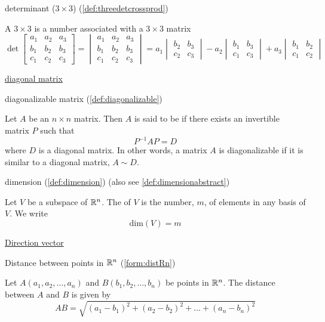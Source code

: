 \documentclass{ximera}
\begin{document}
determinant ($3\times 3$) (\ref{def:threedetcrossprod})
\begin{expandable}
    A $3\times 3$  is a number associated with a $3\times 3$ matrix
$$\det{\begin{bmatrix}
a_1 & a_2 & a_3\\
b_1 & b_2 &b_3\\
c_1 &c_2 &c_3
\end{bmatrix}}=
\begin{vmatrix}
a_1 & a_2 & a_3\\
b_1 & b_2 &b_3\\
c_1 &c_2 &c_3
\end{vmatrix} =a_1
\begin{vmatrix}
b_2 & b_3\\
c_2 & c_3
\end{vmatrix} -a_2
\begin{vmatrix}
b_1 & b_3\\
c_1 & c_3
\end{vmatrix} +a_3
\begin{vmatrix}
b_1 & b_2\\
c_1 & c_2
\end{vmatrix}
$$
\end{expandable}

\href{https://ximera.osu.edu/oerlinalg/LinearAlgebra/MAT-0025/main}{diagonal matrix}

diagonalizable matrix (\ref{def:diagonalizable})
\begin{expandable}
    Let $A$ be an $n\times n$ matrix. Then $A$ is said to be  if there exists an invertible matrix $P$ such that
\begin{equation*}
P^{-1}AP=D
\end{equation*}
where $D$ is a diagonal matrix.  In other words, a matrix $A$ is diagonalizable if it is similar to a diagonal matrix, $A \sim D$.
\end{expandable}

dimension (\ref{def:dimension}) (also see \ref{def:dimensionabstract})
\begin{expandable}
    Let $V$ be a subspace of $\mathbb{R}^n$.  The  of $V$ is the number, $m$, of elements in any basis of $V$.  We write
$$\mbox{dim}(V)=m$$
\end{expandable}

\href{https://ximera.osu.edu/oerlinalg/LinearAlgebra/RRN-0020/main}{Direction vector}

Distance between points in $\mathbb{R}^n$ (\ref{form:distRn})
\begin{expandable}
Let $A(a_1, a_2,\ldots ,a_n)$ and $B(b_1, b_2,\ldots ,b_n)$ be points in $\mathbb{R}^n$.  The distance between $A$ and $B$ is given by
$$AB=\sqrt{(a_1-b_1)^2+(a_2-b_2)^2+\ldots +(a_n-b_n)^2}$$
\end{expandable}
\end{document}
